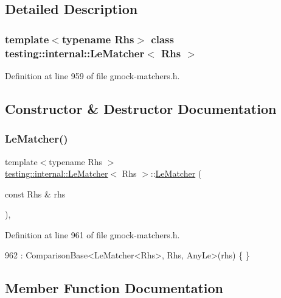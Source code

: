 \subsection{Detailed Description}
\subsubsection*{template$<$typename Rhs$>$\newline
class testing\+::internal\+::\+Le\+Matcher$<$ Rhs $>$}



Definition at line 959 of file gmock-\/matchers.\+h.



\subsection{Constructor \& Destructor Documentation}
\mbox{\label{classtesting_1_1internal_1_1LeMatcher_ae3dce3765263397fa5de202d45d0bdb5}} 
\subsubsection{\texorpdfstring{Le\+Matcher()}{LeMatcher()}}
{\footnotesize\ttfamily template$<$typename Rhs $>$ \\
\hyperlink{classtesting_1_1internal_1_1LeMatcher}{testing\+::internal\+::\+Le\+Matcher}$<$ Rhs $>$\+::\hyperlink{classtesting_1_1internal_1_1LeMatcher}{Le\+Matcher} (\begin{DoxyParamCaption}\item[{const Rhs \&}]{rhs }\end{DoxyParamCaption})\hspace{0.3cm}{\ttfamily [inline]}, {\ttfamily [explicit]}}



Definition at line 961 of file gmock-\/matchers.\+h.


\begin{DoxyCode}
962       : ComparisonBase<LeMatcher<Rhs>, Rhs, AnyLe>(rhs) \{ \}
\end{DoxyCode}


\subsection{Member Function Documentation}
\mbox{\label{classtesting_1_1internal_1_1LeMatcher_adfef0084cb0f28503a40d7157699519b}} 
